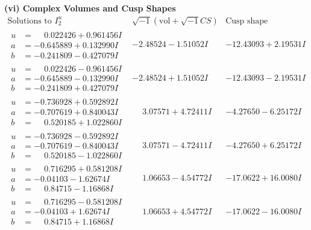 \documentclass[1p]{elsarticle_modified}
\theoremstyle{definition}
\newcommand{\I}{\sqrt{-1}}
\begin{document}
\newpage\flushleft \textbf{(vi) Complex Volumes and Cusp Shapes}
$$\begin{array}{c|c|c}  
\text{Solutions to }I^u_{2}& \I (\text{vol} + \sqrt{-1}CS) & \text{Cusp shape}\\
 \hline 
\begin{aligned}
u &= \phantom{-}0.022426 + 0.961456 I \\
a &= -0.645889 + 0.132990 I \\
b &= -0.241809 - 0.427079 I\end{aligned}
 & -2.48524 - 1.51052 I & -12.43093 + 2.19531 I \\ \hline\begin{aligned}
u &= \phantom{-}0.022426 - 0.961456 I \\
a &= -0.645889 - 0.132990 I \\
b &= -0.241809 + 0.427079 I\end{aligned}
 & -2.48524 + 1.51052 I & -12.43093 - 2.19531 I \\ \hline\begin{aligned}
u &= -0.736928 + 0.592892 I \\
a &= -0.707619 + 0.840043 I \\
b &= \phantom{-}0.520185 + 1.022860 I\end{aligned}
 & \phantom{-}3.07571 + 4.72411 I & -4.27650 - 6.25172 I \\ \hline\begin{aligned}
u &= -0.736928 - 0.592892 I \\
a &= -0.707619 - 0.840043 I \\
b &= \phantom{-}0.520185 - 1.022860 I\end{aligned}
 & \phantom{-}3.07571 - 4.72411 I & -4.27650 + 6.25172 I \\ \hline\begin{aligned}
u &= \phantom{-}0.716295 + 0.581208 I \\
a &= -0.04103 - 1.62674 I \\
b &= \phantom{-}0.84715 - 1.16868 I\end{aligned}
 & \phantom{-}1.06653 - 4.54772 I & -17.0622 + 16.0080 I \\ \hline\begin{aligned}
u &= \phantom{-}0.716295 - 0.581208 I \\
a &= -0.04103 + 1.62674 I \\
b &= \phantom{-}0.84715 + 1.16868 I\end{aligned}
 & \phantom{-}1.06653 + 4.54772 I & -17.0622 - 16.0080 I \\ \hline\begin{aligned}

\end{aligned}
\end{array}$$
\end{document}
